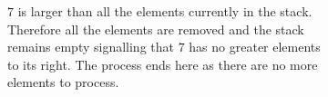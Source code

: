 \begin{figure}
\begin{subfigure}[t]{0.49\textwidth}
\begin{framed}
		\end{framed}
		\caption{$7$ is larger than all the elements currently in the stack. Therefore all the elements are removed and the stack remains empty signalling that $7$ has no greater elements to its right. The process ends here as there are no more elements to process.}
		\label{fig:next_greater:variation1:stack7}
	 \end{subfigure}
	 \caption[]{}
	  \label{fig:next_greater:stack}
\end{figure}